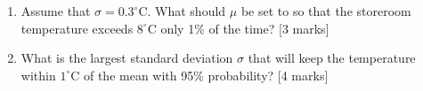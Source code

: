 \begin{enumerate}
\begin{enumerate}
%
\item Assume that $\sigma=0.3^\circ$C. What should $\mu$ be set to so that the storeroom temperature exceeds $8^\circ$C only 1\% of the time?
	\hfill [3 marks]

\item What is the largest standard deviation $\sigma$ that will keep the temperature within $1^\circ$C of the mean with 95\% probability?
	\hfill [4 marks]

\end{enumerate}
\vspace{0.5cm}


\end{enumerate}
